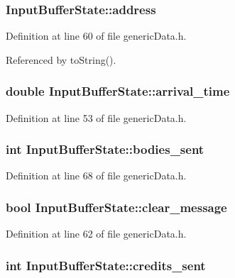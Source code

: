 \subsubsection[{address}]{ {\bf InputBufferState::address}}\label{classInputBufferState_9d86690956721c0fc115e801e9d81e70}




Definition at line 60 of file genericData.h.

Referenced by toString().
\subsubsection[{arrival\_\-time}]{\setlength{\rightskip}{0pt plus 5cm}double {\bf InputBufferState::arrival\_\-time}}\label{classInputBufferState_3295cfdeddaa27d2952cf3fd8e701f2d}




Definition at line 53 of file genericData.h.
\subsubsection[{bodies\_\-sent}]{\setlength{\rightskip}{0pt plus 5cm}int {\bf InputBufferState::bodies\_\-sent}}\label{classInputBufferState_4100c2a267a4d07e71aba2b6b89b2868}




Definition at line 68 of file genericData.h.
\subsubsection[{clear\_\-message}]{\setlength{\rightskip}{0pt plus 5cm}bool {\bf InputBufferState::clear\_\-message}}\label{classInputBufferState_9ac4f2810b98460d47c6bdc6e249a0af}




Definition at line 62 of file genericData.h.
\subsubsection[{credits\_\-sent}]{\setlength{\rightskip}{0pt plus 5cm}int {\bf InputBufferState::credits\_\-sent}}\label{classInputBufferState_a8f8ca8a0cdfe986af02b39a7cda8c22}




